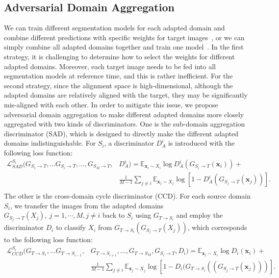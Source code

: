 \documentclass{article}
\begin{document}
\subsection{Adversarial Domain Aggregation}
We can train different segmentation models for each adapted domain and combine different predictions with specific weights for target images~\cite{xu2018deep,peng2018moment}, or we can simply combine all adapted domains together and train one model~\cite{zhao2018adversarial}. In the first strategy, it is challenging to determine how to select the weights for different adapted domains. Moreover, each target image needs to be fed into all segmentation models at reference time, and this is rather inefficient. For the second strategy, since the alignment space is high-dimensional, although the adapted domains are relatively aligned with the target, they may be significantly mis-aligned with each other. In order to mitigate this issue, we propose adversarial domain aggregation to make different adapted domains more closely aggregated with two kinds of discriminators. One is the sub-domain aggregation discriminator (SAD), which is designed to directly make the different adapted domains indistinguishable. For $S_i$, a discriminator $D_A^{i}$ is introduced with the following loss function:
\begin{equation}
\begin{aligned}
\mathcal{L}_{SAD}^{S_i}(G_{S_{1}\rightarrow T}, \dots G_{S_{i}\rightarrow T}, \dots,  G_{S_{M}\rightarrow T}, &D_A^i)=\mathbb{E}_{\mathbf{x}_i\sim X_i}\log D_A^i(G_{S_{i}\rightarrow T}(\mathbf{x}_i))+\\
&\frac{1}{M-1}\sum\nolimits_{j\neq i}\mathbb{E}_{\mathbf{x}_j\sim {X_j}} \log[1-D_A^i(G_{S_{j}\rightarrow  T}(\mathbf{x}_{j}))].\\
\end{aligned}
\label{equ:ganD3}
\end{equation}
The other is the cross-domain cycle discriminator (CCD). For each source domain $S_i$, we transfer the images from the adapted domains $G_{S_j\rightarrow T}(X_j),\ j=1,\cdots,M,j\neq i$ back to $S_i$ using $G_{T\rightarrow S_i}$ and employ the discriminator $D_i$ to classify $X_i$ from $G_{T\rightarrow S_i}(G_{S_j\rightarrow T}(X_j))$, which corresponds to the following loss function:
\begin{equation}
\begin{aligned}
\mathcal{L}_{CCD}^{S_i}(G_{T\rightarrow S_1}, \dots G_{T\rightarrow S_{i-1}}, &G_{T\rightarrow S_{i+1}}, \dots, G_{T\rightarrow S_{M}}, G_{S_i\rightarrow T},D_i)=\mathbb{E}_{\mathbf{x}_{i}\sim X_{i}}\log D_i(\mathbf{x}_{i})+\\
&\frac{1}{M-1}\sum\nolimits_{j\neq i}\mathbb{E}_{\mathbf{x}_{j}\sim X_{j}}\log[1-D_i(G_{T\rightarrow S_{i}}((G_{S_{j}\rightarrow T}(\mathbf{x}_{j})))].\\
\end{aligned}
\label{equ:CCDloss}
\end{equation}
\end{document}
